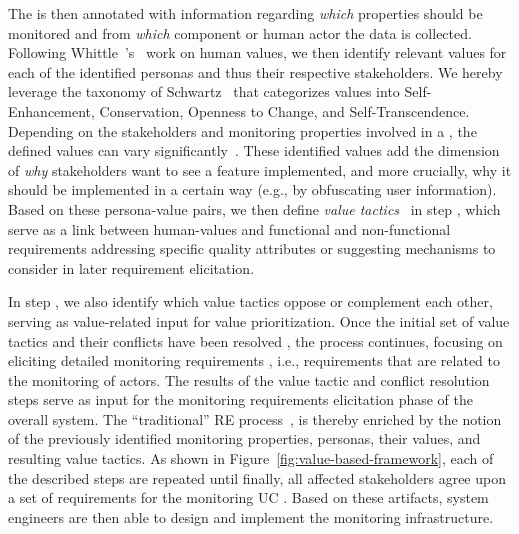 The \muc is then annotated with information regarding \textit{which} properties should be monitored and from \textit{which} component or human actor the data is collected. 
Following Whittle~\etal's~\cite{whittle2021Case} work on human values,  we then identify relevant values  for each of the identified personas and thus their respective stakeholders.
We hereby leverage the taxonomy of Schwartz~\cite{schwartz1992Universals} that categorizes values into Self-Enhancement, Conservation, Openness to Change, and Self-Transcendence. Depending on the stakeholders and monitoring properties involved in a \muc, the defined values can vary significantly~\cite{Spiekermann2023Value}. %
These identified values add the dimension of \textit{why} stakeholders want to see a feature implemented, and more crucially, why it should be implemented in a certain way (e.g., by obfuscating user information).
Based on these persona-value pairs, we then define \textit{value tactics}~\cite{wohlrab2024Supporting} in step , which serve as a link between human-values and functional and non-functional requirements addressing specific quality attributes or suggesting mechanisms to consider in later requirement elicitation.

In step , we also identify which value tactics oppose or complement each other, serving as value-related input for value prioritization.
Once the initial set of value tactics and their conflicts have been resolved , the process continues, focusing on eliciting detailed monitoring requirements , i.e., requirements that are related to the monitoring of actors.
The results of the value tactic and conflict resolution steps serve as input for the monitoring requirements elicitation phase of the overall system. 
The ``traditional'' RE process~\cite{pohl2010requirements}, is thereby  enriched by the notion of the previously identified monitoring properties, personas, their values, and resulting value tactics.
As shown in Figure~\ref{fig:value-based-framework}, each of the described steps are repeated until finally, all affected stakeholders agree upon a set of requirements for the monitoring UC .
Based on these artifacts, system engineers are then able to design and implement the monitoring infrastructure.



